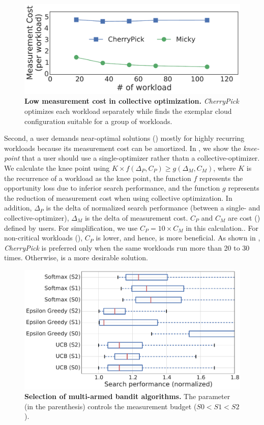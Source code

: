 \begin{figure}[!htbp]
 \includegraphics[width=.8\textwidth]{Figures/s0_single_time_steps_comparison.pdf}
 \centering
 \caption{\textbf{Low measurement cost in collective optimization.} \emph{CherryPick} optimizes each workload separately while \micky finds the exemplar cloud configuration suitable for a group of workloads.}
 \label{fig:cost_saving}
\end{figure}

Second, a user demands near-optimal solutions ()
mostly for highly recurring workloads because its measurement cost can be amortized.
In \mytable{\ref{table:break_even_cost}}, we show the \textit{knee-point} that a user should use a single-optimizer rather thatn a collective-optimizer.
We calculate the knee point using
$K \times f(\Delta_{P}, C_{P}) \ge g(\Delta_{M}, C_{M})$,
where $K$ is the recurrence of a workload as the knee point,
the function $f$ represents the opportunity loss due to inferior search performance, and
the function $g$ represents the reduction of measurement cost when using collective optimization.
In addition, 
$\Delta_{P}$ is the delta of normalized search performance (between a single- and collective-optimizer),
$\Delta_{M}$ is the delta of measurement cost.
$C_{P}$ and $C_{M}$ are cost () defined by users.
For simplification, we use $C_{P} = 10 \times C_{M}$ in this calculation..
For non-critical workloads (),
$C_{P}$ is lower, and hence, \micky is more beneficial.
As shown in \mytable{\ref{table:break_even_cost}},
\emph{CherryPick} is preferred only when
the same workloads run more than 20 to 30 times.
Otherwise, \micky is a more desirable solution.

% 


\begin{figure}[!htbp]
 \includegraphics[width=.8\textwidth]{Figures/s0_single_algorithm_selection.pdf}
 \centering
 \caption{\textbf{Selection of multi-armed bandit algorithms.} The parameter (in the parenthesis) controls the measurement budget ($S0 < S1 < S2$).}
 \label{fig:algorithm_selection}
\end{figure}

